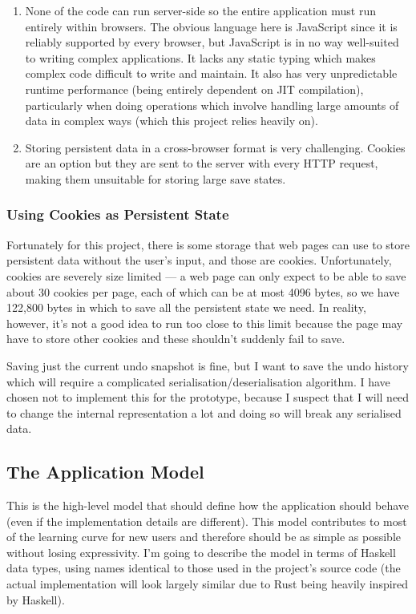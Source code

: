 \documentclass[12pt]{article}
\begin{document}
\begin{enumerate}
    \item None of the code can run server-side so the entire application must run entirely within
        browsers.  The obvious language here is JavaScript since it is reliably supported by every
        browser, but JavaScript is in no way well-suited to writing complex applications.  It lacks
        any static typing which makes complex code difficult to write and maintain.  It also has
        very unpredictable runtime performance (being entirely dependent on JIT compilation),
        particularly when doing operations which involve handling large amounts of data in complex
        ways (which this project relies heavily on).
    \item Storing persistent data in a cross-browser format is very challenging.  Cookies are an
        option but they are sent to the server with every HTTP request, making them unsuitable for
        storing large save states.
\end{enumerate}

\subsubsection{Using Cookies as Persistent State}

Fortunately for this project, there is some storage that web pages can use to store persistent data
without the user's input, and those are cookies.  Unfortunately, cookies are severely size limited
--- a web page can only expect to be able to save about 30 cookies per page, each of which can be at
most 4096 bytes, so we have 122,800 bytes in which to save all the persistent state we need.  In
reality, however, it's not a good idea to run too close to this limit because the page may have to
store other cookies and these shouldn't suddenly fail to save.

Saving just the current undo snapshot is fine, but I want to save the undo history which will
require a complicated serialisation/deserialisation algorithm.  I have chosen not to implement this
for the prototype, because I suspect that I will need to change the internal representation a lot
and doing so will break any serialised data.

\subsection{The Application Model}

This is the high-level model that should define how the application should behave (even if the
implementation details are different).  This model contributes to most of the learning curve for new
users and therefore should be as simple as possible without losing expressivity.  I'm going to
describe the model in terms of Haskell data types, using names identical to those used in the
project's source code (the actual implementation will look largely similar due to Rust being heavily
inspired by Haskell).
\end{document}
